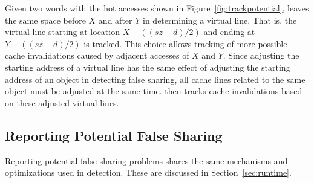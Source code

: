Given two words with the hot accesses shown in Figure~\ref{fig:trackpotential}, 
\Predator{} leaves the same space before $X$ and after $Y$ in determining a virtual line. 
That is, the virtual line starting 
at location $X-((sz-d)/2)$ and ending at $Y+((sz-d)/2)$ is tracked. 
This choice allows tracking of more possible cache invalidations caused by
adjacent accesses of $X$ and $Y$. 
Since adjusting the starting address of a virtual line has the same effect of
adjusting the starting address of an object in detecting false sharing,
all cache lines related to the same object must be adjusted at the same time.
\Predator{} then tracks cache invalidations based on these adjusted virtual lines.

\subsection{Reporting Potential False Sharing}
Reporting potential false sharing problems shares the same mechanisms and optimizations 
used in detection. These are discussed in Section~\ref{sec:runtime}.

